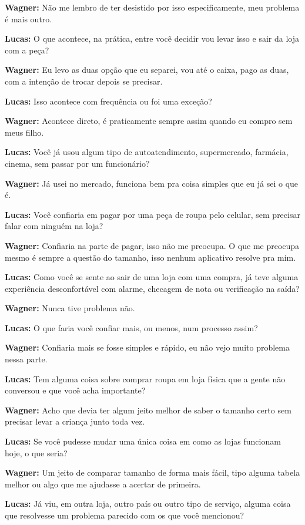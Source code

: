 \textbf{Wagner:} Não me lembro de ter desistido por isso especificamente, meu problema é mais outro.

\textbf{Lucas:} O que acontece, na prática, entre você decidir vou levar isso e sair da loja com a peça?

\textbf{Wagner:} Eu levo as duas opção que eu separei, vou até o caixa, pago as duas, com a intenção de trocar depois se precisar.

\textbf{Lucas:} Isso acontece com frequência ou foi uma exceção?

\textbf{Wagner:} Acontece direto, é praticamente sempre assim quando eu compro sem meus filho.

\textbf{Lucas:} Você já usou algum tipo de autoatendimento, supermercado, farmácia, cinema, sem passar por um funcionário?

\textbf{Wagner:} Já usei no mercado, funciona bem pra coisa simples que eu já sei o que é.

\textbf{Lucas:} Você confiaria em pagar por uma peça de roupa pelo celular, sem precisar falar com ninguém na loja?

\textbf{Wagner:} Confiaria na parte de pagar, isso não me preocupa. O que me preocupa mesmo é sempre a questão do tamanho, isso nenhum aplicativo resolve pra mim.

\textbf{Lucas:} Como você se sente ao sair de uma loja com uma compra, já teve alguma experiência desconfortável com alarme, checagem de nota ou verificação na saída?

\textbf{Wagner:} Nunca tive problema não.

\textbf{Lucas:} O que faria você confiar mais, ou menos, num processo assim?

\textbf{Wagner:} Confiaria mais se fosse simples e rápido, eu não vejo muito problema nessa parte.

\textbf{Lucas:} Tem alguma coisa sobre comprar roupa em loja física que a gente não conversou e que você acha importante?

\textbf{Wagner:} Acho que devia ter algum jeito melhor de saber o tamanho certo sem precisar levar a criança junto toda vez.

\textbf{Lucas:} Se você pudesse mudar uma única coisa em como as lojas funcionam hoje, o que seria?

\textbf{Wagner:} Um jeito de comparar tamanho de forma mais fácil, tipo alguma tabela melhor ou algo que me ajudasse a acertar de primeira.

\textbf{Lucas:} Já viu, em outra loja, outro país ou outro tipo de serviço, alguma coisa que resolvesse um problema parecido com os que você mencionou?

